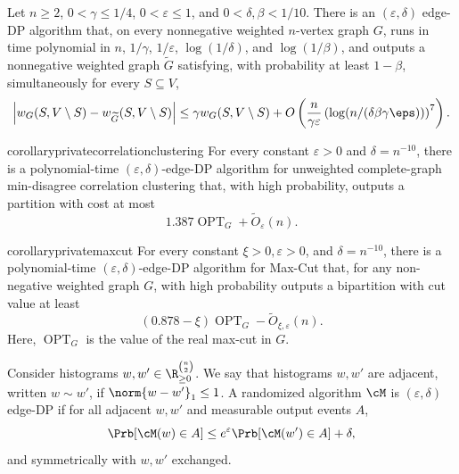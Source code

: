 
\begin{theorem}\label{thm:main}
Let
$n\geq2$, $0<\gamma\leq 1/4$, $0<\varepsilon\leq 1$, and
$0<\delta,\beta<1/10$.  There is an $(\varepsilon, \delta)$ edge-DP algorithm that, on every
nonnegative weighted $n$-vertex graph $G$, runs in time polynomial in
$n$, $1/\gamma$, $1/\varepsilon$, $\log(1/\delta)$, and $\log(1/\beta)$, and outputs a
nonnegative weighted graph $\widetilde{G}$ satisfying, with probability at least $1-\beta$, simultaneously
for every $S\subseteq V$,
\begin{align*}
 \left|w_G(S,V\setminus S)-w_{\widetilde{G}}(S,V\setminus S)\right|
 \leq \gamma w_G(S,V\setminus S)  + O\left(\frac{n}{\gamma\varepsilon}
 \left(\log(n/(\delta\beta\gamma\eps))\right)^{7}\right) .
\end{align*}
\end{theorem}

\begin{restatable}{corollary}{privatecorrelationclustering}
\label{cor:cc-intro}
For every constant $\varepsilon>0$ and $\delta=n^{-10}$, there is a
polynomial-time $(\varepsilon, \delta)$-edge-DP algorithm for unweighted complete-graph min-disagree
correlation clustering that, with high probability, outputs a partition with cost at most
\[
1.387\operatorname{OPT}_G+\widetilde O_{\varepsilon}(n).
\]
\end{restatable}

\begin{restatable}{corollary}{privatemaxcut}
\label{cor:maxcut-intro}
For every constant $\xi>0, \varepsilon>0$, and $\delta=n^{-10}$, there is a polynomial-time $(\varepsilon, \delta)$-edge-DP algorithm for Max-Cut that, for any non-negative weighted graph $G$, with high probability outputs a bipartition with cut value at least
\[
(0.878-\xi)\operatorname{OPT}_G-\widetilde O_{\xi,\varepsilon}(n).
\]
Here, $\operatorname{OPT}_G$ is the value of the real max-cut in $G$.
\end{restatable}

\begin{definition}
\label{def:DP}
Consider histograms $w,w' \in \R_{\geq0}^{\binom{n}{2}}$.
We say that histograms $w,w'$ are adjacent, written $w\sim w'$, if
$\norm{w-w'}_1\leq1$.
A randomized algorithm $\cM$ is $(\varepsilon, \delta)$ edge-DP if for
all adjacent $w,w'$ and measurable output events $A$,
\[
 \Prb[\cM(w)\in A]\leq e^\varepsilon\Prb[\cM(w')\in A]+\delta,
\]
and symmetrically with $w,w'$ exchanged.
\end{definition}

